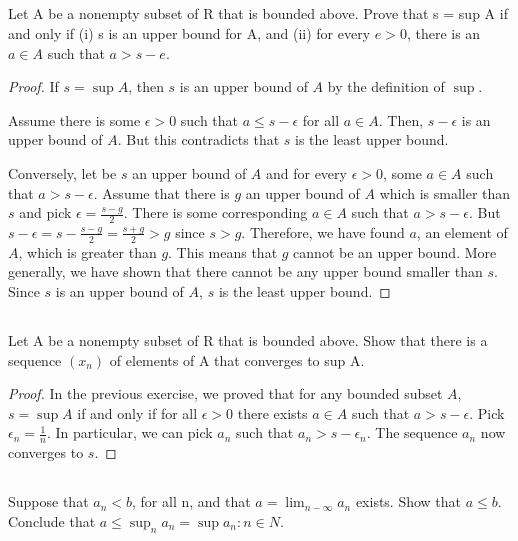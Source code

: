 \subsection{} Let A be a nonempty subset of R that is bounded above. Prove that s = sup A if and only if (i) s is an upper bound for A, and (ii) for every $e > 0$, there is an $a \in A$ such that $a >   s -e$. 

\begin{proof}
If $s = \sup{A}$, then $s$ is an upper bound of $A$ by the definition of $\sup$.

Assume there is some $\epsilon > 0$ such that $a \leq s-\epsilon$ for all $a \in A$. Then, $s - \epsilon$ is an upper bound of $A$. But this contradicts that $s$ is the least upper bound.

Conversely, let be $s$ an upper bound of $A$ and for every $\epsilon > 0$, some $a \in A$ such that $a > s - \epsilon$. Assume that there is $g$ an upper bound of $A$ which is smaller than $s$ and pick $\epsilon = \frac{s - g}{2}$. There is some corresponding $a \in A$ such that $a > s - \epsilon$. But $s - \epsilon = s - \frac{s - g}{2} = \frac{s + g}{2} > g$ since $s > g$. Therefore, we have found $a$, an element of $A$, which is greater than $g$. This means that $g$ cannot be an upper bound. More generally, we have shown that there cannot be any upper bound smaller than $s$. Since $s$ is an upper bound of $A$, $s$ is the least upper bound.


\end{proof}

\subsection{} Let A be  a nonempty subset of R that is bounded above.  Show that there is a   sequence $(x_n)$ of elements of A that converges to sup A. 

\begin{proof}
In the previous exercise, we proved that for any bounded subset $A$, $s = \sup{A}$ if and only if for all $\epsilon > 0$ there exists $a \in A$ such that $a > s - \epsilon$.
Pick $\epsilon_n = \frac{1}{n}$. In particular, we can pick $a_n$ such that $a_n > s - \epsilon_n$. The sequence $a_n$ now converges to $s$.
\end{proof}

\subsection{} Suppose that $a_n < b$, for all  n, and that $a = \lim_{n-\infty} a_n$ exists. Show that $a \leq b$. Conclude that $a \leq \sup_n a_n = \sup {a_n : n \in N}$. 

